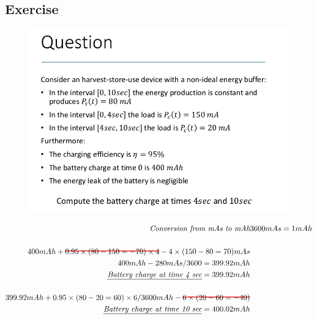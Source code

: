 \subsection{Exercise}
\begin{figure}[htbp]
   \centering
   \includegraphics{images/harveststoreuse_question.png}
   \label{fig:harveststoreuse_question}
\end{figure}
\begin{equation}   
\begin{split}
   \textit{Conversion from mAs to mAh} & 3600 mAs = 1 mAh \\
   \\
   400mAh + \hcancel[red]{0.95\times (80-150=-70)\times 4} - 4\times (150-80=70)mAs\\
   400mAh - 280mAs/3600 = 399.92mAh\\
   \textit{\ul{Battery charge at time 4 sec}} = 399.92mAh\\
   \\
   399.92mAh+ 0.95\times (80-20=60)\times 6/3600mAh - \hcancel[red]{6\times (20-60=-40)}\\
   \textit{\ul{Battery charge at time 10 sec}} = 400.02mAh 
\end{split}
\end{equation}

